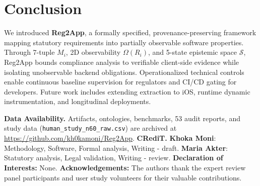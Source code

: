 \section{Conclusion}
\label{sec:conclusion}
We introduced \textbf{Reg2App}, a formally specified, provenance-preserving framework mapping statutory requirements into partially observable software properties. Through 7-tuple $M_i$, 2D observability $\Omega(R_i)$, and 5-state epistemic space $\mathcal{S}$, Reg2App bounds compliance analysis to verifiable client-side evidence while isolating unobservable backend obligations. Operationalized technical controls enable continuous baseline supervision for regulators and CI/CD gating for developers. Future work includes extending extraction to iOS, runtime dynamic instrumentation, and longitudinal deployments.

\noindent\textbf{Data Availability.} Artifacts, ontologies, benchmarks, 53 audit reports, and study data (\texttt{human\_study\_n60\_raw.csv}) are archived at \url{https://github.com/kh0kamoni/Reg2App}. \textbf{CRediT.} \textbf{Khoka Moni}: Methodology, Software, Formal analysis, Writing - draft. \textbf{Maria Akter}: Statutory analysis, Legal validation, Writing - review. \textbf{Declaration of Interests:} None. \textbf{Acknowledgements:} The authors thank the expert review panel participants and user study volunteers for their valuable contributions.

